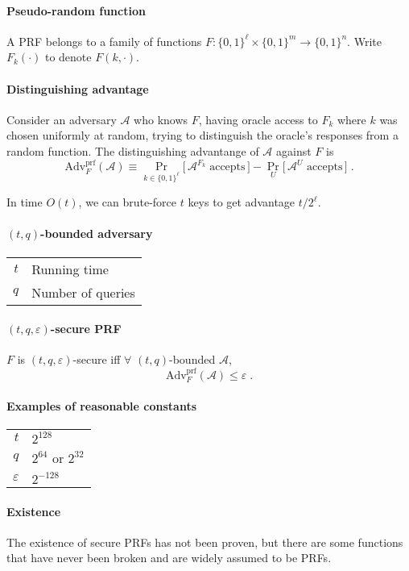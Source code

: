 \documentclass[11pt]{article}
\newcommand{\eqdef}{\ensuremath{\equiv}}
\newcommand{\eps}{\ensuremath{\varepsilon}}
\theoremstyle{remark}
\begin{document}
\paragraph{Pseudo-random function}
A PRF belongs to a family of functions
$F : \{0,1\}^\ell \times \{0,1\}^m \rightarrow \{0,1\}^n$.
Write $F_k(\cdot)$ to denote $F(k, \cdot)$.

\paragraph{Distinguishing advantage}
Consider an adversary $\mathcal{A}$ who knows $F$, having oracle access
to $F_k$ where $k$ was chosen uniformly at random, trying to
distinguish the oracle's responses from a random function.
The distinguishing advantange of $\mathcal{A}$ against $F$ is
\[ \textrm{Adv}_F^\textrm{prf}(\mathcal{A}) \eqdef
\Pr_{k\in\{0,1\}^\ell} \big[\, \mathcal{A}^{F_k}\;\textrm{accepts} \,\big]
- \Pr_U \big[\, \mathcal{A}^U \textrm{ accepts} \,\big] \;\textrm{.} \]

In time $O(t)$, we can brute-force $t$ keys to get
advantage $t / 2^\ell$.

\paragraph{$(t,q)$-bounded adversary}
\begin{tabular}{r|l}
$t$ & Running time \\
$q$ & Number of queries
\end{tabular}

\paragraph{$(t,q,\eps)$-secure PRF}
$F$ is $(t,q,\eps)$-secure iff
$\forall$ $(t,q)$-bounded $\mathcal{A}$,
\[ \textrm{Adv}_F^\textrm{prf}(\mathcal{A}) \le \eps \;\textrm{.} \]

\paragraph{Examples of reasonable constants}
\begin{tabular}{r|l}
$t$ & $2^{128}$ \\
$q$ & $2^{64}$ or $2^{32}$ \\
$\eps$ & $2^{-128}$
\end{tabular}

\paragraph{Existence}
The existence of secure PRFs has not been proven,
but there are some functions that have never been
broken and are widely assumed to be PRFs.
\end{document}
